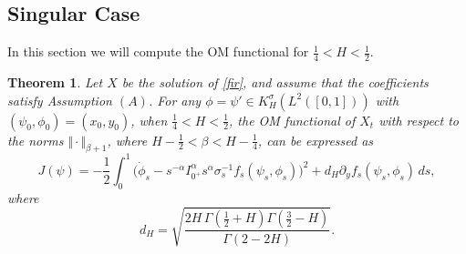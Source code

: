 \documentclass{article}
\newtheorem{theorem}{Theorem}[section]
\theoremstyle{definition}  %
\theoremstyle{plain}  %
\begin{document}
\subsection{Singular Case}
In this section we will compute the OM functional for $\frac{1}{4}< H<\frac{1}{2}.$
\begin{theorem} \label{result1} Let $X$ be the solution of \eqref{fir}, and assume that the coefficients satisfy Assumption \((A)\). 
For any $\phi=\psi' \in K_H^\sigma(L^2([0,1]))$ with $(\psi_0,\phi_0) = (x_0,y_0)$, when $ \tfrac{1}{4} < H < \tfrac{1}{2}$, 
the OM functional of $X_t$ with respect to the norms 
$\Vert \cdot \Vert_{\beta+1}$, where $H-\tfrac{1}{2}<\beta<H-\tfrac{1}{4}$,  can be expressed as  
\begin{equation*}
J(\psi)=-\dfrac{1}{2}\displaystyle\int_0^1 
\Big(
\dot{\phi}_s
- s^{-\alpha} I_{0^+}^\alpha s^{\alpha} 
\sigma_s^{-1} f_s(\psi_s,\phi_s)
\Big)^2 
+ d_H \partial_y f_s(\psi_s,\phi_s) \, ds,
\end{equation*}
where
\begin{equation*}
d_H = \sqrt{\frac{2H \,\Gamma\!\left(\tfrac{1}{2}+H\right)\Gamma\!\left(\tfrac{3}{2}-H\right)}{\Gamma(2-2H)}}.
\end{equation*}

\end{theorem}
\end{document}
